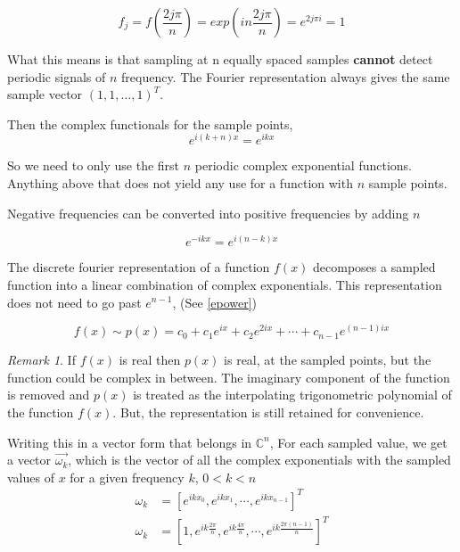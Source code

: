 \documentclass[11pt]{amsart}
\theoremstyle{definition}
\theoremstyle{remark}
\newtheorem{rem}[thm]{Remark}
\numberwithin{equation}{section}
\begin{document}
\[
	f_j = f(\frac{2j \pi}{n}) = exp(in \frac{2j\pi}{n}) = e^{2j\pi i} = 1
\]

What this means is that sampling at n equally spaced samples \textbf{cannot} detect periodic signals of $n$ frequency. The Fourier representation always gives the same sample vector $(1,1,\dots, 1)^T$. 

Then the complex functionals for the sample points,
\begin{equation}
\label{epower}e^{i(k+n)x} = e^{ikx}
\end{equation}



So we need to only use the first $n$ periodic complex exponential functions. Anything above that does not yield any use for a function with $n$ sample points.

Negative frequencies can be converted into positive frequencies by adding $n$

\begin{equation}
	e^{-ikx} = e^{i(n-k)x} \label{negativefreq}
\end{equation}

The discrete fourier representation of a function $f(x)$ decomposes a sampled function into a linear combination of complex exponentials. This representation does not need to go past $e^{n-1}$, (See \ref{epower})

\begin{equation}
	f(x) \sim p(x) = c_0 + c_1 e^{ix} + c_2 e^{2ix} + \cdots + c_{n-1}e^{(n-1)ix}
	\label{repcomp}
\end{equation}
\begin{rem}
	If $f(x)$ is real then $p(x)$ is real, at the sampled points, but the function could be complex in between. The imaginary component of the function is removed and $p(x)$ is treated as the interpolating trigonometric polynomial of the function $f(x)$. But, the representation is still retained for convenience.
\end{rem}

Writing this in a vector form that belongs in $\mathbb{C}^n$, For each sampled value, we get a vector $\vec{\omega_k}$, which is the vector of all the complex exponentials with the sampled values of $x$ for a given frequency $k$, $0 < k < n$
\begin{align*}
	\omega_k &= [e^{i k x_0},e^{ik x_1},\cdots,e^{ik x_{n-1}}]^T \\
	\omega_k &= [1,e^{i k \frac{2\pi}{n}},e^{ik \frac{4\pi}{n}},\cdots,e^{ik \frac{2\pi(n-1)}{n}}]^T \\
\end{align*}
\end{document}
